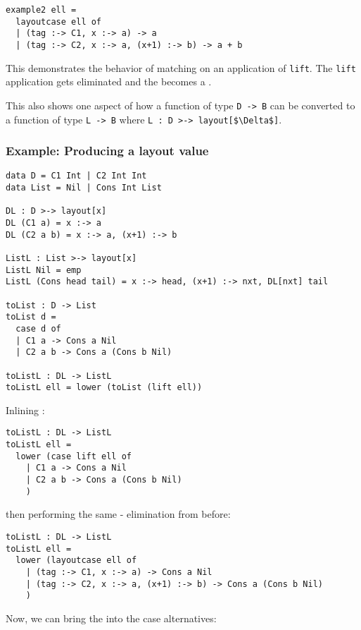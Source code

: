\documentclass[10pt]{article}
\begin{document}
\begin{lstlisting}
example2 ell =
  layoutcase ell of 
  | (tag :-> C1, x :-> a) -> a
  | (tag :-> C2, x :-> a, (x+1) :-> b) -> a + b
\end{lstlisting}

\noindent
This demonstrates the behavior of  matching on an application of \lstinline{lift}. The \lstinline{lift} application
gets eliminated and the  becomes a .

This also shows one aspect of how a function of type \lstinline{D -> B} can be converted to a function of type
\lstinline{L -> B} where \lstinline{L : D >-> layout[$\Delta$]}.

\subsubsection{Example: Producing a layout value}

\begin{lstlisting}
data D = C1 Int | C2 Int Int
data List = Nil | Cons Int List

DL : D >-> layout[x]
DL (C1 a) = x :-> a
DL (C2 a b) = x :-> a, (x+1) :-> b

ListL : List >-> layout[x]
ListL Nil = emp
ListL (Cons head tail) = x :-> head, (x+1) :-> nxt, DL[nxt] tail

toList : D -> List
toList d =
  case d of
  | C1 a -> Cons a Nil
  | C2 a b -> Cons a (Cons b Nil)

toListL : DL -> ListL
toListL ell = lower (toList (lift ell))
\end{lstlisting}

\noindent
Inlining :

\begin{lstlisting}
toListL : DL -> ListL
toListL ell =
  lower (case lift ell of
    | C1 a -> Cons a Nil
    | C2 a b -> Cons a (Cons b Nil)
    )
\end{lstlisting}

\noindent
then performing the same - elimination from before:

\begin{lstlisting}
toListL : DL -> ListL
toListL ell =
  lower (layoutcase ell of
    | (tag :-> C1, x :-> a) -> Cons a Nil
    | (tag :-> C2, x :-> a, (x+1) :-> b) -> Cons a (Cons b Nil)
    )
\end{lstlisting}

\noindent
Now, we can bring the  into the case alternatives:
\end{document}
